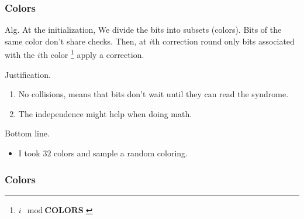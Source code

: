 \documentclass{beamer}
\begin{document}
\begin{frame}
\frametitle{Colors}

\begin{block}{Alg.}
  At the initialization, We divide the bits into subsets (colors). Bits of the same color don't share checks. Then, at $i$th correction round only bits associated with the $i$th color \footnote{$i \mod \textbf{COLORS}$} apply a correction. 
\end{block}

\begin{block}{Justification.}
  \begin{enumerate}
    \item No collisions, means that bits don't wait until they can read the syndrome.  
    \item The independence might help when doing math. 
  \end{enumerate} 
\end{block}

\begin{block}{Bottom line.}
  \begin{itemize}
    \item I took $32$ colors and sample a random coloring. 
  \end{itemize}
\end{block}

\end{frame}

  \begin{frame}
    \frametitle{Colors}    
  \end{frame}
\end{document}
